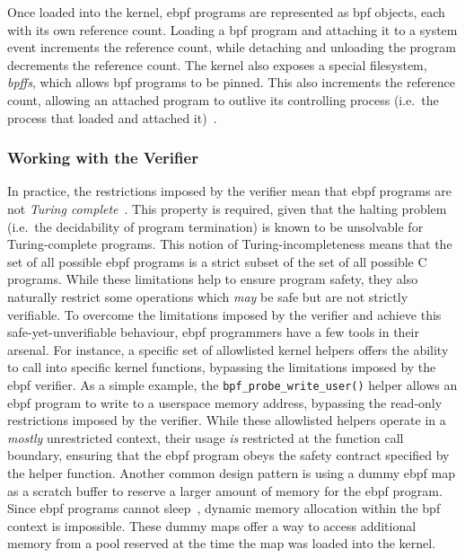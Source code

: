Once loaded into the kernel, \gls{ebpf} programs are represented as \gls{bpf} objects, each with its
own reference count. Loading a \gls{bpf} program and attaching it to a system event increments
the reference count, while detaching and unloading the program decrements the reference
count. The kernel also exposes a special filesystem, \textit{bpffs}, which allows \gls{bpf}
programs to be pinned. This also increments the reference count, allowing an attached
program to outlive its controlling process (i.e.\ the process that loaded and attached
it)~\cite{gregg2019_bpf}.

\subsubsection*{Working with the Verifier}

In practice, the restrictions imposed by the verifier mean that \gls{ebpf} programs are not
\textit{Turing complete}~\cite{gregg2019_bpf}.  This property is required, given that the
halting problem (i.e.\ the decidability of program termination) is known to be unsolvable
for Turing-complete programs. This notion of Turing-incompleteness means that the set of
all possible \gls{ebpf} programs is a strict subset of the set of all possible C programs. While
these limitations help to ensure program safety, they also naturally restrict some
operations which \textit{may} be safe but are not strictly verifiable. To overcome the
limitations imposed by the verifier and achieve this safe-yet-unverifiable behaviour, \gls{ebpf}
programmers have a few tools in their arsenal. For instance, a specific set of allowlisted
kernel helpers offers the ability to call into specific kernel functions, bypassing the
limitations imposed by the \gls{ebpf} verifier. As a simple example, the
\texttt{bpf\_probe\_write\_user()} helper allows an \gls{ebpf} program to write to a userspace
memory address, bypassing the read-only restrictions imposed by the verifier. While these
allowlisted helpers operate in a \textit{mostly} unrestricted context, their usage
\textit{is} restricted at the function call boundary, ensuring that the \gls{ebpf} program obeys
the safety contract specified by the helper function.  Another common design pattern is
using a dummy \gls{ebpf} map as a scratch buffer to reserve a larger amount of memory for the
\gls{ebpf} program.  Since \gls{ebpf} programs cannot sleep~\cite{gregg2019_bpf}, dynamic memory
allocation within the \gls{bpf} context is impossible. These dummy maps offer a way to access
additional memory from a pool reserved at the time the map was loaded into the kernel.

